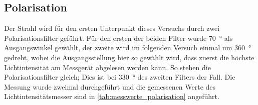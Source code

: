 \documentclass[ngerman]{scrartcl}
\begin{document}
\subsection{Polarisation}
\label{sec:durchfuehrung_polarisation}
Der Strahl wird für den ersten Unterpunkt dieses Versuchs durch zwei Polarisationsfilter geführt. Für den ersten der beiden Filter wurde \SI{70}{\degree} als Ausgangswinkel gewählt, der zweite wird im folgenden Versuch einmal um \SI{360}{\degree} gedreht, wobei die Ausgangsstellung hier so gewählt wird, dass zuerst die höchste Lichtintensität am Messgerät abgelesen werden kann. So stehen die Polarisationsfilter gleich; Dies ist bei \SI{330}{\degree} des zweiten Filters der Fall.
Die Messung wurde zweimal durchgeführt und die gemessenen Werte des Lichtintensitätsmesser sind in \autoref{tab:messwerte_polarisation} angeführt.
\end{document}
